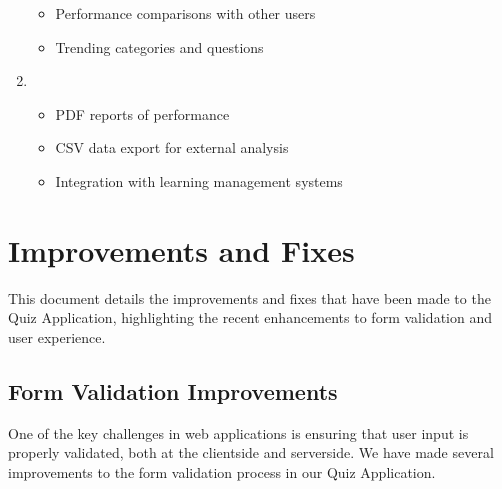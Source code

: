 \documentclass[letterpaper,10pt,english]{sphinxmanual}
\begin{document}
\begin{enumerate}
\begin{itemize}
\item {} 
\sphinxAtStartPar
Performance comparisons with other users

\item {} 
\sphinxAtStartPar
Trending categories and questions

\end{itemize}

\item {} 
\sphinxAtStartPar
{}
\begin{itemize}
\item {} 
\sphinxAtStartPar
PDF reports of performance

\item {} 
\sphinxAtStartPar
CSV data export for external analysis

\item {} 
\sphinxAtStartPar
Integration with learning management systems

\end{itemize}

\end{enumerate}

\sphinxstepscope


\section{Improvements and Fixes}
\label{\detokenize{improvements:improvements-and-fixes}}\label{\detokenize{improvements::doc}}
\sphinxAtStartPar
This document details the improvements and fixes that have been made to the Quiz Application,
highlighting the recent enhancements to form validation and user experience.


\subsection{Form Validation Improvements}
\label{\detokenize{improvements:form-validation-improvements}}
\sphinxAtStartPar
One of the key challenges in web applications is ensuring that user input is properly validated,
both at the client\sphinxhyphen{}side and server\sphinxhyphen{}side. We have made several improvements to the form validation
process in our Quiz Application.
\end{document}
